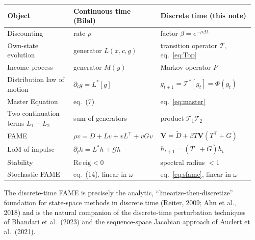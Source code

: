 \documentclass[11pt]{article}
\newcommand{\Tr}{\mathcal{T}}
\newcommand{\Tstar}{\mathcal{T}^{*}}
\newcommand{\Gop}{\mathcal{G}}
\begin{document}
\begin{center}
\renewcommand{\arraystretch}{1.35}
\begin{tabular}{l l l}
\hline
\textbf{Object} & \textbf{Continuous time (Bilal)} & \textbf{Discrete time (this note)}\\
\hline
Discounting & rate $\rho$ & factor $\beta=e^{-\rho\Delta t}$\\
Own-state evolution & generator $L(x,c,g)$ & transition operator $\Tr$, eq.~\eqref{eq:Top}\\
Income process & generator $M(y)$ & Markov operator $P$\\
Distribution law of motion & $\partial_t g=L^{*}[g]$ & $g_{t+1}=\Tstar[g_t]=\Phi(g_t)$\\
Master Equation & eq.~(7) & eq.~\eqref{eq:master}\\
Two continuation terms $L_1+L_2$ & sum of generators & product $\Tr_1\Tr_2$\\
FAME & $\rho v=D+Lv+vL^{\top}+vGv$ & $\mathbf V=\widetilde D+\beta T\mathbf V(T^{\top}+G)$\\
LoM of impulse & $\partial_t h=L^{*}h+\Gop h$ & $h_{t+1}=(T^{\top}+G)h_t$\\
Stability & $\mathrm{Re}\,\mathrm{eig}<0$ & spectral radius $<1$\\
Stochastic FAME & eq.~(14), linear in $\omega$ & eq.~\eqref{eq:sfame}, linear in $\omega$\\
\hline
\end{tabular}
\end{center}

\noindent
The discrete-time FAME is precisely the analytic, ``linearize-then-discretize''
foundation for state-space methods in discrete time (Reiter, 2009; Ahn et al., 2018)
and is the natural companion of the discrete-time perturbation techniques of
Bhandari et al.\ (2023) and the sequence-space Jacobian approach of Auclert et al.\
(2021).
\end{document}
